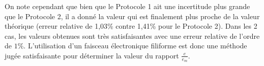 \documentclass[a4paper,10pt,french]{scrartcl}
\begin{document}
On note cependant que bien que le Protocole 1 ait une incertitude plus grande que le Protocole 2, il a donné la valeur qui est finalement plus proche de la valeur théorique (erreur relative de 1,03\% contre 1,41\% pour le Protocole 2). Dans les 2 cas, les valeurs obtenues sont très satisfaisantes avec une erreur relative de l'ordre de \(1\%\). L'utilisation d'un faisceau électronique filiforme est donc une méthode jugée satisfaisante pour déterminer la valeur du rapport \(\frac{e}{e_m}\).
\end{document}
